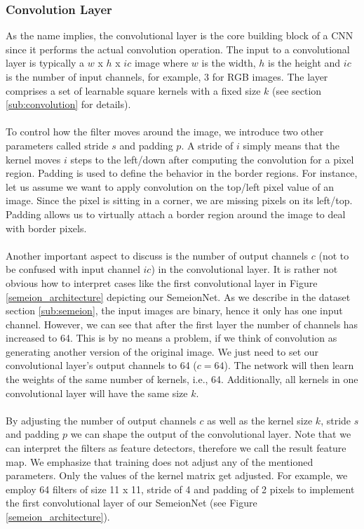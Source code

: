 \documentclass[a4paper, 11pt, twoside, openright]{article}
\begin{document}
\subsubsection{Convolution Layer} \label{subsub:clayer}
As the name implies, the convolutional layer is the core building block of a CNN since it performs the actual convolution operation. The input to a convolutional layer is typically a $w$ x $h$ x $ic$ image where $w$ is the width, $h$ is the height and $ic$ is the number of input channels, for example, 3 for RGB images. The layer comprises a set of learnable square kernels with a fixed size $k$ (see section \ref{sub:convolution} for details). \\ \\
To control how the filter moves around the image, we introduce two other parameters called stride $s$ and padding $p$. A stride of $i$ simply means that the kernel moves $i$ steps to the left/down after computing the convolution for a pixel region. Padding is used to define the behavior in the border regions. For instance, let us assume we want to apply convolution on the top/left pixel value of an image. Since the pixel is sitting in a corner, we are missing pixels on its left/top. Padding allows us to virtually attach a border region around the image to deal with border pixels.\\ \\
Another important aspect to discuss is the number of output channels $c$ (not to be confused with input channel $ic$) in the convolutional layer. It is rather not obvious how to interpret cases like the first convolutional layer in Figure \ref{semeion_architecture} depicting our SemeionNet. As we describe in the dataset section \ref{sub:semeion}, the input images are binary, hence it only has one input channel. However, we can see that after the first layer the number of channels has increased to 64. This is by no means a problem, if we think of convolution as generating another version of the original image. We just need to set our convolutional layer's output channels to 64 ($c=64$).
The network will then learn the weights of the same number of kernels, i.e., 64. Additionally, all kernels in one convolutional layer will have the same size $k$. \\ \\
By adjusting the number of output channels $c$ as well as the kernel size $k$, stride $s$ and padding $p$ we can shape the output of the convolutional layer. Note that we can interpret the filters as feature detectors, therefore we call the result feature map. We emphasize that training does not adjust any of the mentioned parameters. Only the values of the kernel matrix get adjusted. For example, we employ 64 filters of size 11 x 11, stride of 4 and padding of 2 pixels to implement the first convolutional layer of our SemeionNet (see Figure \ref{semeion_architecture}).
\end{document}
